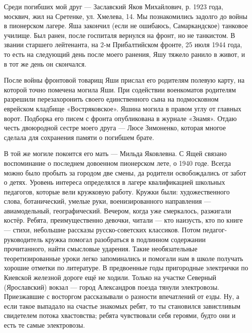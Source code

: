 \label{15-2}
Среди погибших мой друг — Заславский Яков Михайлович, р. 1923 года, москвич, жил на Сретенке, ул. Хмелева, 14. Мы познакомились задолго до войны в пионерском лагере. Яша закончил (если не ошибаюсь, Самаркандское) танковое училище. Был ранен, после госпиталя вернулся на фронт, но не танкистом. В звании старшего лейтенанта, на 2-м Прибалтийском фронте, 25 июля 1944 года, то есть на следующий день после моего ранения, Яшу тяжело ранило в живот, и в тот же день он скончался.

\label{15-3}
После войны фронтовой товарищ Яши прислал его родителям полевую карту, на которой точно помечена могила Яши. При содействии военкоматов родителям разрешили перезахоронить своего единственного сына на подмосковном еврейском кладбище «Востряковское». Яшина могила в правом углу от главных ворот. Подборка его писем с фронта опубликована в журнале «Знамя». Отдаю честь двоюродной сестре моего друга — Люсе Зимоненко, которая многое сделала для сохранения памяти о погибшем брате.

\label{16-1}
В той же могиле покоится его мать — Мильда Яковлевна. С Ящей связано воспоминание о последнем довоенном пионерском лете, о 1940 годе. Всегда можно было пробыть за городом две смены, да родители освобождались от забот о детях. Уровень интереса определялся в лагере квалификацией школьных педагогов, которые вели кружковую работу. Кружки были: художественного слова, ботанический, умелые руки, военизированного направления — авиамодельный, географический. Вечером, когда уже смеркалось, разжигали костёр. Ребята, преимущественно девочки, читали — кто наизусть, кто по книге — стихи, небольшие рассказы русско-советских классиков. Потом педагог-руководитель кружка помогал разобраться в подлинном содержании прочитанного, найти смысловые ударения. Такие необязательные теоретизированные уроки легко запоминались и помогали нам в школе получать хорошие отметки по литературе.
В предвоенные годы пригородные электрички по Киевской железной дороге ещё не ходили. Только на участке Северный (Ярославский) вокзал — город Александров поезда тянули электровозы. Приезжавшие с восторгом рассказывали о разности впечатлений от езды. Ну, а если такое выпадало на счастье знакомых ребят, то ты становился завистливым свидетелем потока хвастовства; ребята чувствовали себя героями, будто они и есть те самые электровозы.

